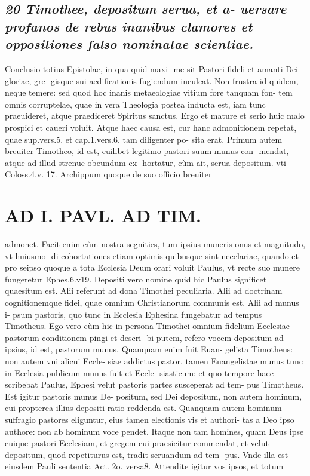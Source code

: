 \documentclass{article}
\begin{document}
\begin{pages}
\subsection*{\textit{20 Timothee, depositum serua, et a- uersare profanos de rebus inanibus clamores et oppositiones falso nominatae scientiae. }}\pstart Conclusio totius Epistolae, in qua quid maxi- me sit Pastori fideli et amanti Dei gloriae, gre- gisque sui aedificationis fugiendum inculcat. Non frustra id quidem, neque temere: sed quod hoc inanis metaeologiae vitium fore tanquam fon- tem omnis corruptelae, quae in vera Theologia postea inducta est, iam tunc praeuideret, atque praediceret Spiritus sanctus. Ergo et mature et serio huic malo prospici et caueri voluit. Atque haec causa est, cur hanc admonitionem repetat, quae sup.vers.5. et cap.1.vers.6. tam diligenter po- sita erat. Primum autem breuiter Timotheo, id est, cuilibet legitimo pastori suum munus con- mendat, atque ad illud strenue obeundum ex- hortatur, cùm ait, serua depositum. vti Coloss.4.v. 17. Archippum quoque de suo officio breuiter  \pend
\section*{AD I. PAVL. AD TIM. }
\marginpar{[ p.398 ]}\pstart admonet. Facit enim cùm nostra segnities, tum ipsius muneris onus et magnitudo, vt huiusmo- di cohortationes etiam optimis quibusque sint necelariae, quando et pro seipso quoque a tota Ecclesia Deum orari voluit Paulus, vt recte suo munere fungeretur Ephes.6.v19. Depositi vero nomine quid hic Paulus significet quaesitum est. Alii referunt ad dona Timothei peculiaria. Alii ad doctrinam cognitionemque fidei, quae omnium Christianorum communis est. Alii ad munus i- psum pastoris, quo tunc in Ecclesia Ephesina fungebatur ad tempus Timotheus. Ego vero cùm hic in persona Timothei omnium fidelium Ecclesiae pastorum conditionem pingi et descri- bi putem, refero vocem depositum ad ipsius, id est, pastorum munus. Quanquam enim fuit Euan- gelista Timotheus: non autem vni alicui Eccle- siae addictus pastor, tamen Euangelistae munus tunc in Ecclesia publicum munus fuit et Eccle- siasticum: et quo tempore haec scribebat Paulus, Ephesi velut pastoris partes susceperat ad tem- pus Timotheus. Est igitur pastoris munus De- positum, sed Dei depositum, non autem hominum, cui propterea illius depositi ratio reddenda est. Quanquam autem hominum suffragio pastores eliguntur, eius tamen electionis vis et authori- tas a Deo ipso authore: non ab hominum voce pendet. Itaque non tam homines, quam Deus ipse cuique pastori Ecclesiam, et gregem cui praesicitur commendat, et velut depositum, quod repetiturus est, tradit seruandum ad tem- pus. Vnde illa est eiusdem Pauli sententia Act. 2o. versa8. Attendite igitur vos ipsos, et totum  \pend

\end{pages}
\end{document}
